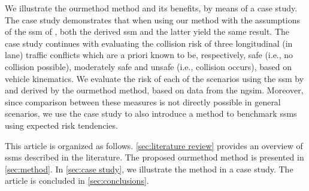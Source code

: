 \cstartb We illustrate the \ac{ourmethod} method and its benefits, by means of a case study. 
The case study demonstrates that when using our method with the assumptions of the \ac{ssm} of \textcite{wang2014evaluation}, both the derived \ac{ssm} and the latter yield the same result.
The case study continues with evaluating the collision risk of three longitudinal (in lane) traffic conflicts which are a priori known to be, respectively, safe (i.e., no collision possible), moderately safe and unsafe (i.e., collision occurs), based on vehicle kinematics. 
We evaluate the risk of each of the scenarios using the \ac{ssm} by \textcite{wang2014evaluation} and  derived by the \ac{ourmethod} method, based on data from the \ac{ngsim}. 
Moreover, since comparison between these measures is not directly possible in general scenarios, we use the case study to also introduce a method to benchmark \acp{ssm} using expected risk tendencies. \cendb

This article is organized as follows.
\cref{sec:literature review} provides an overview of \acp{ssm} described in the literature.
The proposed \ac{ourmethod} method is presented in \cref{sec:method}.
In \cref{sec:case study}, we illustrate the method in a case study.
The article is concluded in \cref{sec:conclusions}.

